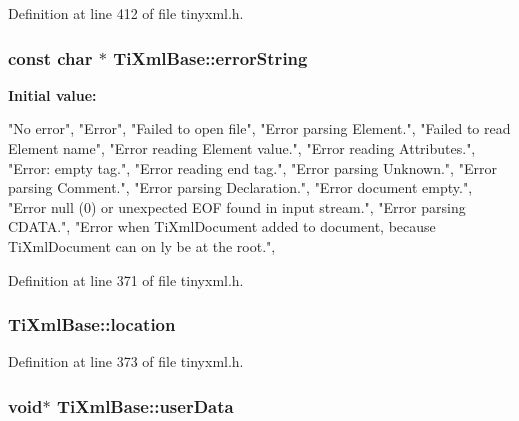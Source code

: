 Definition at line 412 of file tinyxml.h.

\hypertarget{class_ti_xml_base_a7ac8feec4100e446b3d78e1ac0659700}{
\subsubsection[{errorString}]{\setlength{\rightskip}{0pt plus 5cm}const char $\ast$ {\bf TiXmlBase::errorString}}}
\label{class_ti_xml_base_a7ac8feec4100e446b3d78e1ac0659700}
{\bfseries Initial value:}
\begin{DoxyCode}

{
        "No error",
        "Error",
        "Failed to open file",
        "Error parsing Element.",
        "Failed to read Element name",
        "Error reading Element value.",
        "Error reading Attributes.",
        "Error: empty tag.",
        "Error reading end tag.",
        "Error parsing Unknown.",
        "Error parsing Comment.",
        "Error parsing Declaration.",
        "Error document empty.",
        "Error null (0) or unexpected EOF found in input stream.",
        "Error parsing CDATA.",
        "Error when TiXmlDocument added to document, because TiXmlDocument can on
      ly be at the root.",
}
\end{DoxyCode}


Definition at line 371 of file tinyxml.h.

\hypertarget{class_ti_xml_base_a0d992580f3bc264909f898e942677a3c}{
\subsubsection[{location}]{ {\bf TiXmlBase::location}}}
\label{class_ti_xml_base_a0d992580f3bc264909f898e942677a3c}


Definition at line 373 of file tinyxml.h.

\hypertarget{class_ti_xml_base_ab242c01590191f644569fa89a080d97c}{
\subsubsection[{userData}]{\setlength{\rightskip}{0pt plus 5cm}void$\ast$ {\bf TiXmlBase::userData}}}
\label{class_ti_xml_base_ab242c01590191f644569fa89a080d97c}



